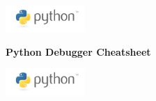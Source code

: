 \documentclass[11pt,landscape,a4paper]{article}
\begin{document}
  \begin{center}
    \begin{minipage}[c]{0.15\textwidth}
      \includegraphics[width=3cm]{python-logo}
    \end{minipage}
    \begin{minipage}[c]{0.43\textwidth}
      \huge \bfseries Python Debugger Cheatsheet
    \end{minipage}
    \begin{minipage}[r]{0.15\textwidth}
      \includegraphics[width=3cm]{python-logo}
    \end{minipage}
    \vspace{1cm}
  \end{center}
\end{document}
